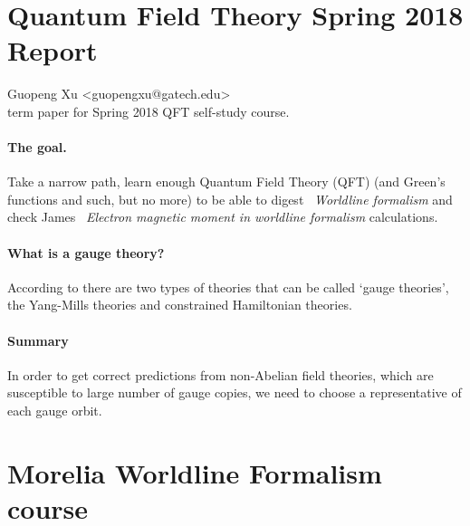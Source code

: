 
\section{Quantum Field Theory Spring 2018 Report}

\noindent
Guopeng Xu <guopengxu@gatech.edu> \\
term paper for Spring 2018 QFT self-study course.


\paragraph{The goal.}
    Take a narrow path, learn enough Quantum Field Theory (QFT) (and
    Green's functions and such, but no more) to be able to digest
    ~{\em Worldline formalism} and check James
    ~{\em Electron magnetic moment in
    worldline formalism} calculations.

 \paragraph{What is a gauge theory?}
According to there are two types of theories
that can be called \lq gauge theories\rq, the Yang-Mills theories and
constrained Hamiltonian theories.

\paragraph{Summary}
In order to get correct predictions from non-Abelian field theories,
which are susceptible to large number of gauge copies, we need to choose
a representative of each gauge orbit.

\section{Morelia Worldline Formalism course}
\label{c-MoreliaCourse}

